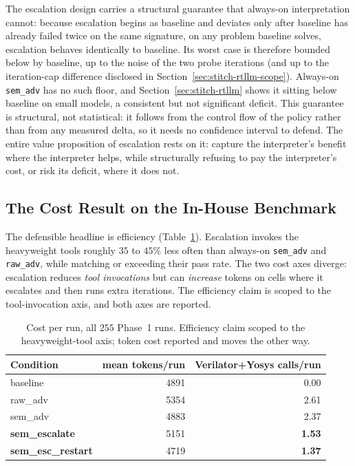 \documentclass[11pt]{article}
\begin{document}
The escalation design carries a structural guarantee that always-on
interpretation cannot: because escalation begins as baseline and deviates only
after baseline has already failed twice on the same signature, on any problem
baseline solves, escalation behaves identically to baseline. Its worst case is
therefore bounded below by baseline, up to the noise of the two probe
iterations (and up to the iteration-cap difference disclosed in
Section~\ref{sec:stitch-rtllm-scope}). Always-on \texttt{sem\_adv} has no such
floor, and Section~\ref{sec:stitch-rtllm} shows it sitting below baseline on
small models, a consistent but not significant deficit. This guarantee is
structural, not statistical: it follows from the control flow of the policy
rather than from any measured delta, so it needs no confidence interval to
defend. The entire value proposition of escalation rests on it: capture the
interpreter's benefit where the interpreter helps, while structurally refusing
to pay the interpreter's cost, or risk its deficit, where it does not.

\subsection{The Cost Result on the In-House Benchmark}
\label{sec:escalate-cost}

The defensible headline is efficiency (Table~\ref{tab:cost}). Escalation
invokes the heavyweight tools roughly $35$ to $45\%$ less often than
always-on \texttt{sem\_adv} and \texttt{raw\_adv}, while matching or exceeding
their pass rate. The two cost axes diverge: escalation reduces \emph{tool
invocations} but can \emph{increase} tokens on cells where it escalates and
then runs extra iterations. The efficiency claim is scoped to the
tool-invocation axis, and both axes are reported.

\begin{table}[htbp]
\centering
\caption{Cost per run, all $255$ Phase~1 runs. Efficiency claim scoped to the
heavyweight-tool axis; token cost reported and moves the other way.}
\label{tab:cost}
\small
\begin{tabularx}{\linewidth}{@{} X r r @{}}
\toprule
\textbf{Condition} & \textbf{mean tokens/run} & \textbf{Verilator+Yosys calls/run} \\
\midrule
baseline                & 4891 & 0.00 \\
raw\_adv                & 5354 & 2.61 \\
sem\_adv                & 4883 & 2.37 \\
\textbf{sem\_escalate}  & 5151 & \textbf{1.53} \\
\textbf{sem\_esc\_restart} & 4719 & \textbf{1.37} \\
\bottomrule
\end{tabularx}
\end{table}
\end{document}
